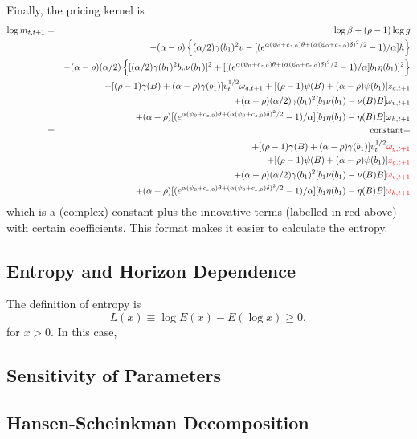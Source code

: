 \documentclass[11pt,reqno,final]{amsart}
\begin{document}
Finally, the pricing kernel is
\begin{eqnarray*}
\log m_{t,t+1} &=& \log \beta + (\rho-1) \log g \\
    & & -(\alpha-\rho)\left\{(\alpha/2)\gamma(b_1)^2 v - [(e^{\alpha(\psi_0+c_{z,0})\theta+(\alpha(\psi_0+c_{z,0})\delta)^2/2}-1)/\alpha] h \right\} \\
    & & -(\alpha-\rho)(\alpha/2)\left\{ [(\alpha/2)\gamma(b_1)^2 b_v\nu(b_1)]^2 + [[(e^{\alpha(\psi_0+c_{z,0})\theta+(\alpha(\psi_0+c_{z,0})\delta)^2/2}-1)/\alpha] b_1\eta(b_1)]^2 \right\} \\
    & & + [(\rho-1)\gamma(B)+(\alpha-\rho)\gamma(b_1)] v_t^{1/2} \omega_{g,t+1} + [(\rho-1)\psi(B)+(\alpha-\rho)\psi(b_1)] z_{g,t+1} \\
    & & + (\alpha-\rho) (\alpha/2)\gamma(b_1)^2 [b_1\nu(b_1)-\nu(B)B]\omega_{v,t+1} \\
    & & + (\alpha-\rho) [(e^{\alpha(\psi_0+c_{z,0})\theta+(\alpha(\psi_0+c_{z,0})\delta)^2/2}-1)/\alpha] [b_1\eta(b_1)-\eta(B)B]\omega_{h,t+1} \\
    &=& \textrm{constant} + \\
    & & + [(\rho-1)\gamma(B)+(\alpha-\rho)\gamma(b_1)] v_t^{1/2} {\color{red} \omega_{g,t+1}} \\
    & & + [(\rho-1)\psi(B)+(\alpha-\rho)\psi(b_1)] {\color{red} z_{g,t+1}} \\
    & & + (\alpha-\rho) (\alpha/2)\gamma(b_1)^2 [b_1\nu(b_1)-\nu(B)B] {\color{red} \omega_{v,t+1}} \\
    & & + (\alpha-\rho) [(e^{\alpha(\psi_0+c_{z,0})\theta+(\alpha(\psi_0+c_{z,0})\delta)^2/2}-1)/\alpha] [b_1\eta(b_1)-\eta(B)B] {\color{red} \omega_{h,t+1}}
\end{eqnarray*}
which is a (complex) constant plus the innovative terms (labelled in red above) with certain coefficients. This format makes it easier to calculate the entropy. 

\subsection{Entropy and Horizon Dependence}
The definition of entropy is 
$$
L(x) \equiv \log E(x) - E(\log x) \geq 0,
$$
for $x>0$. In this case, 

\subsection{Sensitivity of Parameters}

\subsection{Hansen-Scheinkman Decomposition}
\end{document}
